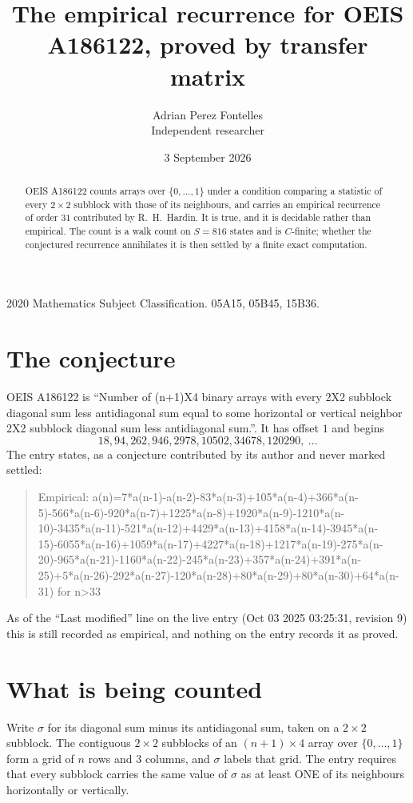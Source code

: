 \documentclass[11pt,a4paper]{article}
\title{The empirical recurrence for OEIS A186122, proved by transfer matrix}
\author{Adrian Perez Fontelles\\ \small Independent researcher}
\date{3 September 2026}
\theoremstyle{plain}
\theoremstyle{definition}
\begin{document}
\maketitle

\begin{abstract}
OEIS A186122 counts arrays over $\{0,\dots,1\}$ under a condition comparing a statistic of
every $2\times2$ subblock with those of its neighbours, and carries an empirical recurrence
of order $31$ contributed by R.~H.~Hardin. It is true, and it is decidable rather than
empirical. The count is a walk count on $S=816$ states and is $C$-finite; whether the
conjectured recurrence annihilates it is then settled by a finite exact computation.
\end{abstract}

\noindent\small 2020 Mathematics Subject Classification. 05A15, 05B45, 15B36.\normalsize

\section{The conjecture}

OEIS A186122 is ``Number of (n+1)X4 binary arrays with every 2X2 subblock diagonal sum less antidiagonal sum equal to some horizontal or vertical neighbor 2X2 subblock diagonal sum less antidiagonal sum.''. It has offset $1$ and begins
\[
18, 94, 262, 946, 2978, 10502, 34678, 120290,\ \dots
\]
The entry states, as a conjecture contributed by its author and never marked settled:
\begin{quote}
Empirical: a(n)=7*a(n-1)-a(n-2)-83*a(n-3)+105*a(n-4)+366*a(n-5)-566*a(n-6)-920*a(n-7)+1225*a(n-8)+1920*a(n-9)-1210*a(n-10)-3435*a(n-11)-521*a(n-12)+4429*a(n-13)+4158*a(n-14)-3945*a(n-15)-6055*a(n-16)+1059*a(n-17)+4227*a(n-18)+1217*a(n-19)-275*a(n-20)-965*a(n-21)-1160*a(n-22)-245*a(n-23)+357*a(n-24)+391*a(n-25)+5*a(n-26)-292*a(n-27)-120*a(n-28)+80*a(n-29)+80*a(n-30)+64*a(n-31) for n>33
\end{quote}
As of the ``Last modified'' line on the live entry (Oct 03 2025 03:25:31, revision 9) this is still
recorded as empirical, and nothing on the entry records it as proved.

\section{What is being counted}

Write $\sigma$ for its diagonal sum minus its antidiagonal sum, taken on a $2\times2$ subblock. The contiguous $2\times2$
subblocks of an $(n+1)\times4$ array over $\{0,\dots,1\}$ form a grid of $n$ rows
and $3$ columns, and $\sigma$ labels that grid. The entry
requires that every subblock carries the same value of $\sigma$ as at least ONE of its neighbours horizontally or vertically.
\end{document}
